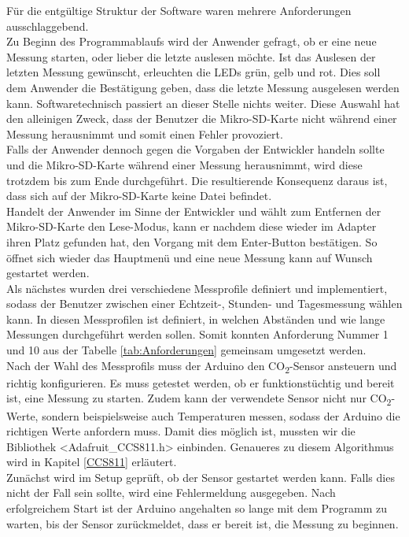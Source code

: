 \label{Softwaremplementierung}



Für die entgültige Struktur der Software waren mehrere Anforderungen ausschlaggebend. \\
Zu Beginn des Programmablaufs wird der Anwender gefragt, ob er eine neue Messung starten, oder lieber die letzte auslesen möchte. Ist das Auslesen der letzten Messung gewünscht, erleuchten die LEDs grün, gelb und rot. Dies soll dem Anwender die Bestätigung geben, dass die letzte Messung ausgelesen werden kann. Softwaretechnisch passiert an dieser Stelle nichts weiter. Diese Auswahl hat den alleinigen Zweck, dass der Benutzer die Mikro-SD-Karte nicht während einer Messung herausnimmt und somit einen Fehler provoziert. \\
Falls der Anwender dennoch gegen die Vorgaben der Entwickler handeln sollte und die Mikro-SD-Karte während einer Messung herausnimmt, wird diese trotzdem bis zum Ende durchgeführt. Die resultierende Konsequenz daraus ist, dass sich auf der Mikro-SD-Karte keine Datei befindet. \\
Handelt der Anwender im Sinne der Entwickler und wählt zum Entfernen der Mikro-SD-Karte den Lese-Modus, kann er nachdem diese wieder im Adapter ihren Platz gefunden hat, den Vorgang mit dem Enter-Button bestätigen. So öffnet sich wieder das Hauptmenü und eine neue Messung kann auf Wunsch gestartet werden. \\
Als nächstes wurden drei verschiedene Messprofile definiert und implementiert, sodass der Benutzer zwischen einer Echtzeit-, Stunden- und Tagesmessung wählen kann. In diesen Messprofilen ist definiert, in welchen Abständen und wie lange Messungen durchgeführt werden sollen. Somit konnten Anforderung Nummer 1 und 10 aus der Tabelle \ref{tab:Anforderungen} gemeinsam umgesetzt werden. \\
Nach der Wahl des Messprofils muss der Arduino den CO\textsubscript{2}-Sensor ansteuern und richtig konfigurieren. Es muss getestet werden, ob er funktionstüchtig und bereit ist, eine Messung zu starten. Zudem kann der verwendete Sensor nicht nur CO\textsubscript{2}-Werte, sondern beispielsweise auch Temperaturen messen, sodass der Arduino die richtigen Werte anfordern muss. Damit dies möglich ist, mussten wir die Bibliothek <Adafruit\_CCS811.h> einbinden. Genaueres zu diesem Algorithmus wird in Kapitel \ref{CCS811} erläutert. \\
Zunächst wird im Setup geprüft, ob der Sensor gestartet werden kann. Falls dies nicht der Fall sein sollte, wird eine Fehlermeldung ausgegeben. Nach erfolgreichem Start ist der Arduino angehalten so lange mit dem Programm zu warten, bis der Sensor zurückmeldet, dass er bereit ist, die Messung zu beginnen. \\
